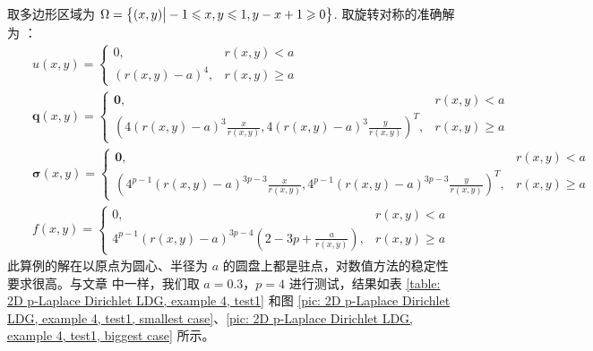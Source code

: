 取多边形区域为 \(\Omega = \left\{(x,y) \big| -1\leqslant x, y \leqslant 1, y-x+1\geqslant 0\right\}\). 取旋转对称的准确解为 \cite{10.1090/S0025-5718-1993-1192966-4}：
\begin{subequations}
	\begin{eqnarray}
		&& u(x,y) = \begin{cases}
			0, & r(x,y) < a \\
			(r(x,y) - a)^{4}, & r(x,y) \geqslant a 
		\end{cases} \\
		&& \bm q(x,y) = \begin{cases}
			\bm 0, & r(x,y) < a \\
			\left(4 (r(x,y)-a)^{3} \frac{x}{r(x,y)}, 4 (r(x,y)-a)^{3} \frac{y}{r(x,y)}\right)^{T}, & r(x,y) \geqslant a 
		\end{cases} \\
		&& \bm\sigma(x,y) = \begin{cases}
			\bm 0, & r(x,y) < a \\
			\left(4^{p-1} (r(x,y)-a)^{3p-3} \frac{x}{r(x,y)}, 4^{p-1} (r(x,y)-a)^{3p-3} \frac{y}{r(x,y)}\right)^{T}, & r(x,y) \geqslant a 
		\end{cases} \\
		&& f(x,y) = \begin{cases}
			0, & r(x,y) < a \\
			4^{p-1} (r(x,y) - a)^{3p-4} \left(2 - 3p + \frac{a}{r(x,y)}\right), & r(x,y) \geqslant a 
		\end{cases}
	\end{eqnarray}
\end{subequations}
此算例的解在以原点为圆心、半径为 \(a\) 的圆盘上都是驻点，对数值方法的稳定性要求很高。与文章 \cite{10.1090/S0025-5718-1993-1192966-4} 中一样，我们取 \(a = 0.3\)，\(p = 4\) 进行测试，结果如表 \ref{table: 2D p-Laplace Dirichlet LDG, example 4, test1} 和图 \ref{pic: 2D p-Laplace Dirichlet LDG, example 4, test1, smallest case}、\ref{pic: 2D p-Laplace Dirichlet LDG, example 4, test1, biggest case} 所示。

